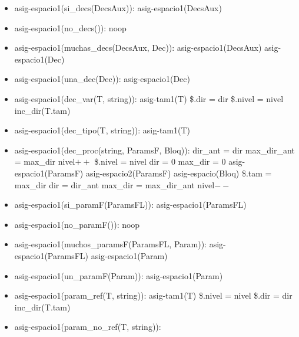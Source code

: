 \documentclass[11pt]{article}
\begin{document}
        \begin{itemize}
            \item asig-espacio1(si\_decs(DecsAux)): 
                \subitem asig-espacio1(DecsAux)
            \item asig-espacio1(no\_decs()): 
                \subitem noop
            \item asig-espacio1(muchas\_decs(DecsAux, Dec)): 
                \subitem asig-espacio1(DecsAux)
                \subitem asig-espacio1(Dec)
            \item asig-espacio1(una\_dec(Dec)): 
                \subitem asig-espacio1(Dec)
            \item asig-espacio1(dec\_var(T, string)): 
                \subitem asig-tam1(T)
                \subitem \$.dir = dir
                \subitem \$.nivel = nivel
                \subitem inc\_dir(T.tam)
            \item asig-espacio1(dec\_tipo(T, string)): 
                \subitem asig-tam1(T)
            \item asig-espacio1(dec\_proc(string, ParamsF, Bloq)): 
                \subitem dir\_ant = dir
                \subitem max\_dir\_ant = max\_dir
                \subitem nivel$++$
                \subitem \$.nivel = nivel
                \subitem dir = 0
                \subitem max\_dir = 0
                \subitem asig-espacio1(ParamsF)
                \subitem asig-espacio2(ParamsF)
                \subitem asig-espacio(Bloq)
                \subitem \$.tam = max\_dir
                \subitem dir = dir\_ant
                \subitem max\_dir = max\_dir\_ant
                \subitem nivel$--$
            \item asig-espacio1(si\_paramF(ParamsFL)): 
                \subitem asig-espacio1(ParamsFL)
            \item asig-espacio1(no\_paramF()): 
                \subitem noop
            \item asig-espacio1(muchos\_paramsF(ParamsFL, Param)): 
                \subitem asig-espacio1(ParamsFL)
                \subitem asig-espacio1(Param)
            \item asig-espacio1(un\_paramF(Param)): 
                \subitem asig-espacio1(Param)
            \item asig-espacio1(param\_ref(T, string)): 
                \subitem asig-tam1(T)
                \subitem \$.nivel = nivel
                \subitem \$.dir = dir
                \subitem inc\_dir(T.tam)
            \item asig-espacio1(param\_no\_ref(T, string)): 

\end{itemize}
\end{document}

